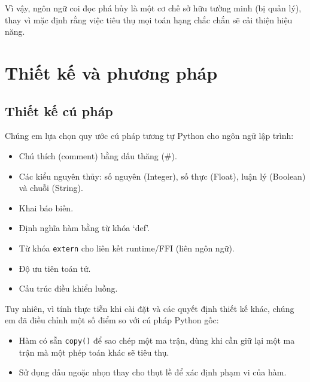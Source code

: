 \documentclass[a4paper]{article}
\begin{document}
	Vì vậy, ngôn ngữ coi đọc phá hủy là một cơ chế sở hữu tường minh (bị quản lý), thay vì mặc định rằng việc tiêu thụ mọi toán hạng chắc chắn sẽ cải thiện hiệu năng.
	
	\section{Thiết kế và phương pháp}
	
	\subsection{Thiết kế cú pháp}
	
	Chúng em lựa chọn quy ước cú pháp tương tự Python cho ngôn ngữ lập trình:
	\begin{itemize}
		\item Chú thích (comment) bằng dấu thăng (\#).
		\item Các kiểu nguyên thủy: số nguyên (Integer), số thực (Float), luận lý (Boolean) và chuỗi (String).
		\item Khai báo biến.
		\item Định nghĩa hàm bằng từ khóa `def'.
		\item Từ khóa \texttt{extern} cho liên kết runtime/FFI (liên ngôn ngữ).
		\item Độ ưu tiên toán tử.
		\item Cấu trúc điều khiển luồng.
	\end{itemize}
	Tuy nhiên, vì tính thực tiễn khi cài đặt và các quyết định thiết kế khác, chúng em đã điều chỉnh một số điểm so với cú pháp Python gốc:
	\begin{itemize}
		\item Hàm có sẵn \texttt{copy()} để sao chép một ma trận, dùng khi cần giữ lại một ma trận mà một phép toán khác sẽ tiêu thụ.
		\item Sử dụng dấu ngoặc nhọn thay cho thụt lề để xác định phạm vi của hàm.
	\end{itemize}
	
\end{document}
